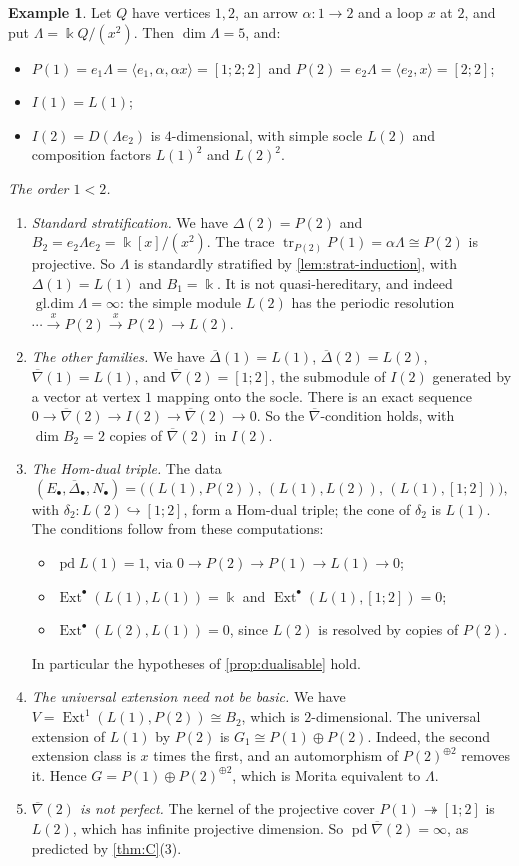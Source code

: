 \documentclass[11pt,reqno]{amsart}
\theoremstyle{plain}
\theoremstyle{definition}
\newtheorem{example}[theorem]{Example}
\theoremstyle{remark}
\newcommand{\kk}{\Bbbk}
\DeclareMathOperator{\Ext}{Ext}
\DeclareMathOperator{\gldim}{gl.dim}
\DeclareMathOperator{\pd}{pd}
\DeclareMathOperator{\tr}{tr}
\newcommand{\nablabar}{\overline{\nabla}}
\newcommand{\Deltabar}{\overline{\Delta}}
\begin{document}
\begin{example}\label{ex:two-strata}
Let $Q$ have vertices $1,2$, an arrow $\alpha\colon1\to2$ and a loop $x$ at $2$, and put $\Lambda=\kk Q/(x^2)$. Then $\dim\Lambda=5$, and:
\begin{itemize}
\item $P(1)=e_1\Lambda=\langle e_1,\alpha,\alpha x\rangle=[1;2;2]$ and $P(2)=e_2\Lambda=\langle e_2,x\rangle=[2;2]$;
\item $I(1)=L(1)$;
\item $I(2)=D(\Lambda e_2)$ is $4$-dimensional, with simple socle $L(2)$ and composition factors $L(1)^2$ and $L(2)^2$.
\end{itemize}

\emph{The order $1<2$.}
\begin{enumerate}
\item \emph{Standard stratification.} We have $\Delta(2)=P(2)$ and $B_2=e_2\Lambda e_2=\kk[x]/(x^2)$. The trace $\tr_{P(2)}P(1)=\alpha\Lambda\cong P(2)$ is projective. So $\Lambda$ is standardly stratified by \cref{lem:strat-induction}, with $\Delta(1)=L(1)$ and $B_1=\kk$. It is not quasi-hereditary, and indeed $\gldim\Lambda=\infty$: the simple module $L(2)$ has the periodic resolution $\cdots\xrightarrow{x}P(2)\xrightarrow{x}P(2)\to L(2)$.
\item \emph{The other families.} We have $\Deltabar(1)=L(1)$, $\Deltabar(2)=L(2)$, $\nablabar(1)=L(1)$, and $\nablabar(2)=[1;2]$, the submodule of $I(2)$ generated by a vector at vertex $1$ mapping onto the socle. There is an exact sequence $0\to\nablabar(2)\to I(2)\to\nablabar(2)\to0$. So the $\nablabar$-condition holds, with $\dim B_2=2$ copies of $\nablabar(2)$ in $I(2)$.
\item \emph{The Hom-dual triple.} The data
\[(E_\bullet,\Deltabar_\bullet,N_\bullet)=\big((L(1),P(2)),\,(L(1),L(2)),\,(L(1),[1;2])\big),\]
with $\delta_2\colon L(2)\hookrightarrow[1;2]$, form a Hom-dual triple; the cone of $\delta_2$ is $L(1)$. The conditions follow from these computations:
\begin{itemize}
\item $\pd L(1)=1$, via $0\to P(2)\to P(1)\to L(1)\to0$;
\item $\Ext^\bullet(L(1),L(1))=\kk$ and $\Ext^\bullet(L(1),[1;2])=0$;
\item $\Ext^\bullet(L(2),L(1))=0$, since $L(2)$ is resolved by copies of $P(2)$.
\end{itemize}
In particular the hypotheses of \cref{prop:dualisable} hold.
\item \emph{The universal extension need not be basic.} We have $V=\Ext^1(L(1),P(2))\cong B_2$, which is $2$-dimensional. The universal extension of $L(1)$ by $P(2)$ is $G_1\cong P(1)\oplus P(2)$. Indeed, the second extension class is $x$ times the first, and an automorphism of $P(2)^{\oplus2}$ removes it. Hence $G=P(1)\oplus P(2)^{\oplus2}$, which is Morita equivalent to $\Lambda$.
\item \emph{$\nablabar(2)$ is not perfect.} The kernel of the projective cover $P(1)\twoheadrightarrow[1;2]$ is $L(2)$, which has infinite projective dimension. So $\pd\nablabar(2)=\infty$, as predicted by \cref{thm:C}(3).
\end{enumerate}


\end{example}
\end{document}
